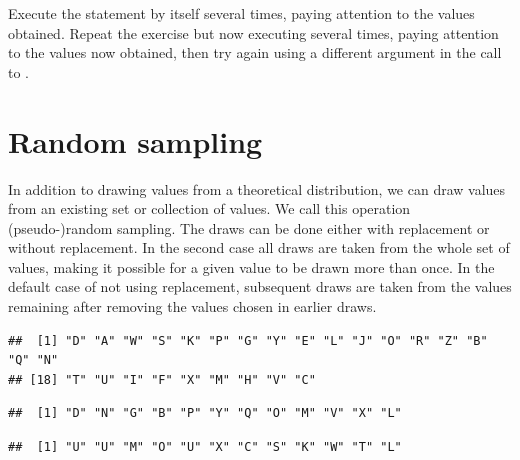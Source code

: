 \documentclass[krantz2]{krantz}\usepackage{knitr}%
\begin{document}
\begin{advplayground}
Execute the statement  by itself several times, paying attention to the values obtained. Repeat the exercise but now executing  several times, paying attention to the values now obtained, then try again using a different argument in the call to .
\end{advplayground}

\section{Random sampling}

In addition to drawing values from a theoretical distribution, we can draw values from an existing set or collection of values. We call this operation (pseudo-)random sampling. The draws can be done either with replacement or without replacement. In the second case all draws are taken from the whole set of values, making it possible for a given value to be drawn more than once. In the default case of not using replacement, subsequent draws are taken from the values remaining after removing the values chosen in earlier draws.

\begin{knitrout}\footnotesize
{}\color{fgcolor}\begin{kframe}
\begin{alltt}
\hlstd{(} 
\end{alltt}
\begin{verbatim}
##  [1] "D" "A" "W" "S" "K" "P" "G" "Y" "E" "L" "J" "O" "R" "Z" "B" "Q" "N"
## [18] "T" "U" "I" "F" "X" "M" "H" "V" "C"
\end{verbatim}
\begin{alltt}
\hlstd{(}   \hlstd{=} \hlstd{)}
\end{alltt}
\begin{verbatim}
##  [1] "D" "N" "G" "B" "P" "Y" "Q" "O" "M" "V" "X" "L"
\end{verbatim}
\begin{alltt}
\hlstd{(}   \hlstd{=} \hlstd{,}  \hlstd{=} \hlstd{)}
\end{alltt}
\begin{verbatim}
##  [1] "U" "U" "M" "O" "U" "X" "C" "S" "K" "W" "T" "L"
\end{verbatim}
\end{kframe}
\end{knitrout}
\end{document}
